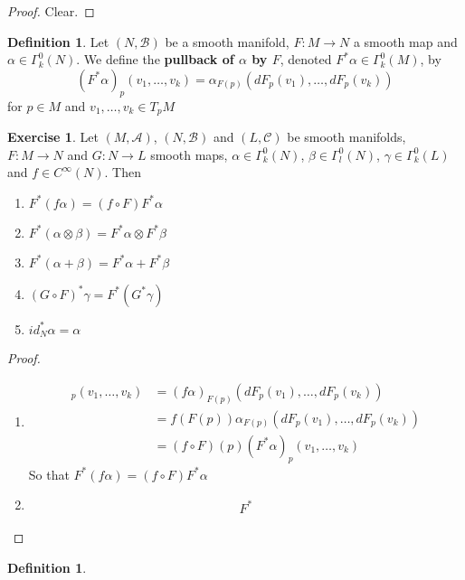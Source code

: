 \documentclass[12pt]{amsart}
\theoremstyle{definition}
\newtheorem{defn}[definition]{Definition}
\newtheorem{ex}[definition]{Exercise}
\newcommand{\al}{\alpha}
\newcommand{\gam}{\gamma}
\newcommand{\Gam}{\Gamma}
\newcommand{\bet}{\beta}
\newcommand{\MA}{\mathcal{A}}
\newcommand{\MC}{\mathcal{C}}
\newcommand{\MB}{\mathcal{B}}
\begin{document}
	\begin{proof}
	Clear.
	\end{proof}
	
	\begin{defn}
	Let $(N, \MB)$ be a smooth manifold, $F:M \rightarrow N$ a smooth map and $\al \in \Gam^0_k(N)$. We define the \textbf{pullback of $\al$ by $F$}, denoted $F^*\al \in \Gam^0_k(M)$, by  $$(F^*\al)_p(v_1, \dots, v_k) = \al_{F(p)} (dF_p(v_1), \dots, dF_p(v_k))$$ for $p \in M$ and $v_1, \dots, v_k \in T_pM$
	\end{defn}

	\begin{ex}
	Let $(M, \MA)$, $(N, \MB)$ and $(L, \MC)$ be smooth manifolds, $F:M \rightarrow N$ and $G:N \rightarrow L$ smooth maps, $\al \in \Gam^0_k(N)$, $\bet  \in \Gam^0_l(N)$, $\gam \in \Gam^0_k(L)$ and $f \in C^{\infty}(N)$. Then 
	\begin{enumerate}
	\item $F^*(f \al) = (f \circ F) F^* \al$
	\item $F^*(\al \otimes \bet) = F^*\al \otimes F^* \bet$
	\item $F^*(\al + \bet) = F^* \al + F^* \bet $
	\item $(G \circ F)^*\gam = F^*(G^* \gam)$
	\item $id_N^* \al = \al$
	\end{enumerate}
	\end{ex}
	
	\begin{proof}\
	\begin{enumerate}
	\item 
	\begin{align*}
	[F^*(f \al)]_p(v_1, \dots, v_k) 
	&= (f \al )_{F(p)}(dF_p(v_1), \dots, dF_p(v_k)) \\
	&= f (F(p)) \al_{F(p)} (dF_p(v_1), \dots, dF_p(v_k)) \\
	&= (f \circ F)(p) (F^*\al)_p(v_1, \dots, v_k)
	\end{align*}
	So that $F^*(f \al) = (f \circ F) F^* \al$
	\item 
	\begin{align*}
		F^*
	\end{align*}
	\end{enumerate}
	
	\end{proof}
	
	
	
	
	
	\begin{defn}
	
	\end{defn}
\end{document}
